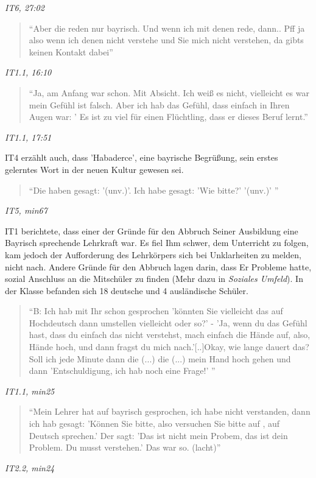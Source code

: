 \centerline{\textit{IT6, 27:02}}
\begin{quote}
    ``Aber die reden nur bayrisch. Und wenn ich mit denen rede, dann.. Pff ja also wenn ich denen nicht verstehe und Sie mich nicht verstehen, da gibts keinen Kontakt dabei''
\end{quote}
\centerline{\textit{IT1.1, 16:10}}
\begin{quote}
    ``Ja, am Anfang war schon. Mit Absicht. Ich weiß es nicht, vielleicht es war mein Gefühl ist falsch. Aber ich hab das Gefühl, dass einfach in Ihren Augen war: ' Es ist zu viel für einen Flüchtling, dass er dieses Beruf lernt.''
\end{quote}
\centerline{\textit{IT1.1, 17:51}}
IT4 erzählt auch, dass 'Habaderce', eine bayrische Begrüßung, sein erstes gelerntes Wort in der neuen Kultur gewesen sei.
\begin{quote}
    ``Die haben gesagt: '(unv.)'. Ich habe gesagt: 'Wie bitte?' '(unv.)' ''
\end{quote}
\centerline{\textit{IT5, min67}}
IT1 berichtete, dass einer der Gründe für den Abbruch Seiner Ausbildung eine Bayrisch sprechende Lehrkraft war. Es fiel Ihm schwer, dem Unterricht zu folgen, kam jedoch der Aufforderung des Lehrkörpers sich bei Unklarheiten zu melden, nicht nach. Andere Gründe für den Abbruch lagen darin, dass Er Probleme hatte, sozial Anschluss an die Mitschüler zu finden (Mehr dazu in \textit{Soziales Umfeld}). 
In der Klasse befanden sich 18 deutsche und 4 ausländische Schüler.

\begin{quote}
    ``B: Ich hab mit Ihr schon gesprochen 'könnten Sie vielleicht das auf Hochdeutsch dann umstellen vielleicht oder so?' - 'Ja, wenn du das Gefühl hast, dass du einfach das nicht verstehst, mach einfach die Hände auf, also, Hände hoch, und dann fragst du mich nach.'[..]Okay, wie lange dauert das? Soll ich jede Minute dann die (...) die (...) mein Hand hoch gehen und dann 'Entschuldigung, ich hab noch eine Frage!' ''
\end{quote}
\centerline{\textit{IT1.1, min25}}

\begin{quote}
    ``Mein Lehrer hat auf bayrisch gesprochen, ich habe nicht verstanden, dann ich hab gesagt: 'Können Sie bitte, also versuchen Sie bitte auf , auf Deutsch sprechen.' Der sagt: 'Das ist nicht mein Probem, das ist dein Problem. Du musst verstehen.' Das war so. (lacht)''
\end{quote}
\centerline{\textit{IT2.2, min24}}
